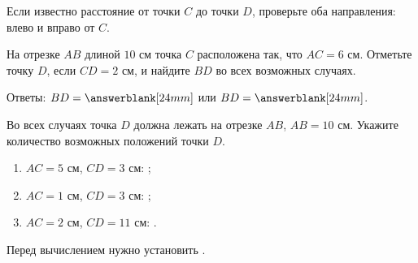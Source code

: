 \begin{warningbox}[Важно]
  Если известно расстояние от точки \(C\) до точки \(D\), проверьте оба
  направления: влево и вправо от \(C\).
\end{warningbox}

\begin{practicebox}
  На отрезке \(AB\) длиной \(10\text{ см}\) точка \(C\) расположена так,
  что \(AC=6\text{ см}\). Отметьте точку \(D\), если \(CD=2\text{ см}\),
  и найдите \(BD\) во всех возможных случаях.

  \studenttwocasesfigure

  Ответы: \(BD=\answerblank[24mm]\) или \(BD=\answerblank[24mm]\).
\end{practicebox}

\begin{checkpointbox}
  Во всех случаях точка \(D\) должна лежать на отрезке \(AB\),
  \(AB=10\text{ см}\). Укажите количество возможных положений точки \(D\).
  \begin{enumerate}[label=\alph*),itemsep=0.55em]
    \item \(AC=5\text{ см}\), \(CD=3\text{ см}\): \answerblank[18mm];
    \item \(AC=1\text{ см}\), \(CD=3\text{ см}\): \answerblank[18mm];
    \item \(AC=2\text{ см}\), \(CD=11\text{ см}\): \answerblank[18mm].
  \end{enumerate}
\end{checkpointbox}

\begin{reflectionbox}[Итог]
  Перед вычислением нужно установить \answerblank[70mm].
\end{reflectionbox}
